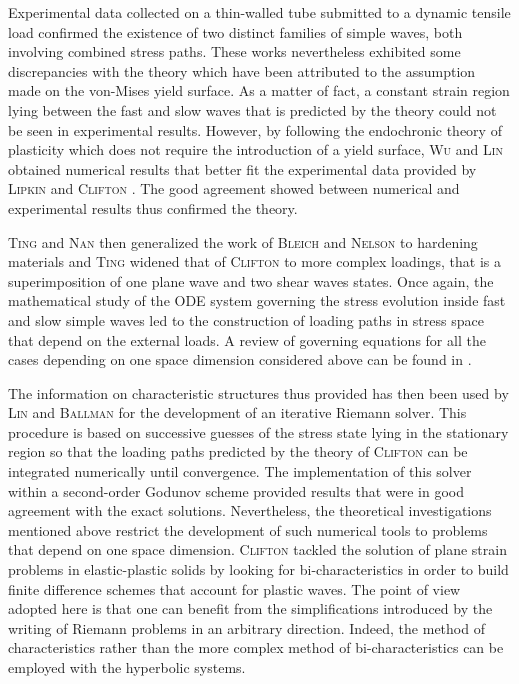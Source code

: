 Experimental data collected on a thin-walled tube submitted to a dynamic tensile load \cite{Clifton_exp,Clifton_exp2} confirmed the existence of two distinct families of  simple waves, both involving combined stress paths.
These works nevertheless exhibited some discrepancies with the theory which have been attributed to the assumption made on the von-Mises yield surface.
As a matter of fact, a constant strain region lying between the fast and slow waves that is predicted by the theory \cite{Clifton} could not be seen in experimental results.
However, by following the endochronic theory of plasticity \cite{Valanis} which does not require the introduction of a yield surface, \textsc{Wu} and \textsc{Lin} \cite{Wu_experimental} obtained numerical results that better fit the experimental data provided by \textsc{Lipkin} and \textsc{Clifton} \cite{Clifton_exp2}.
The good agreement showed between numerical and experimental results \cite{Wu_experimental} thus confirmed the theory.

\textsc{Ting} and \textsc{Nan} \cite{Ting68} then generalized the work of \textsc{Bleich} and \textsc{Nelson} to hardening materials and \textsc{Ting} \cite{Ting69} widened that of \textsc{Clifton} to more complex loadings, that is a superimposition of one plane wave and two shear waves states.
Once again, the mathematical study of the ODE system governing the stress evolution inside fast and slow simple waves led to the construction of loading paths in stress space that depend on the external loads. A review of governing equations for all the cases depending on one space dimension considered above can be found in \cite{Nowacki}.

The information on characteristic structures thus provided has then been used by \textsc{Lin} and \textsc{Ballman} \cite{Lin_et_Ballman} for the development of an iterative Riemann solver.
This procedure is based on successive guesses of the stress state lying in the stationary region so that the loading paths predicted by the theory of \textsc{Clifton} \cite{Clifton} can be integrated numerically until convergence.
The implementation of this solver within a second-order Godunov scheme provided results that were in good agreement with the exact solutions.
Nevertheless, the theoretical investigations mentioned above restrict the development of such numerical tools to problems that depend on one space dimension.
\textsc{Clifton} tackled the solution of plane strain problems in elastic-plastic solids by looking for bi-characteristics \cite{Clifton_thesis} in order to build finite difference schemes that account for plastic waves.
The point of view adopted here is that one can benefit from the simplifications introduced by the writing of Riemann problems in an arbitrary direction.
Indeed, the method of characteristics rather than the more complex method of bi-characteristics can be employed with the hyperbolic systems.

